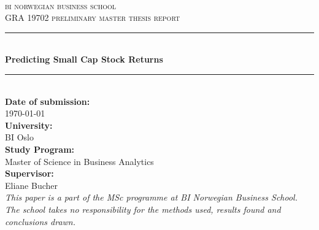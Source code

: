 \begin{titlepage}

\newcommand{\HRule}{\color{rockwoolcolor}\rule{\linewidth}{0.75mm}\color{black}} %

\center %
 
\ \\[1.5cm]
\textsc{\LARGE bi norwegian business school}\\[1.5cm] %
\textsc{\Large GRA 19702
preliminary master thesis report}\\[2.5cm] %



\HRule \\[0.4cm]
{ \huge \bfseries Predicting Small Cap Stock Returns \\[0.5cm]} %
\HRule \\[2.5cm]
 

{\large \textbf{Date of submission:}\\  \today}\\[0.5cm] %
{\large \textbf{University:}\\  BI Oslo}\\[0.5cm] %
{\large \textbf{Study Program:}\\  Master of Science in Business Analytics}\\[0.5cm]
{\large \textbf{Supervisor:}\\  Eliane Bucher}\\[0.5cm]   

\textit{This paper is a part of the MSc programme at BI Norwegian Business School. The school takes no
responsibility for the methods used, results found and conclusions drawn.}
\vfill %

\end{titlepage}